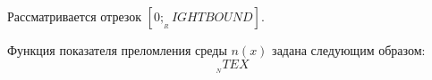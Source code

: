 Рассматривается отрезок $[0; __RIGHTBOUND]$.

Функция показателя преломления среды $n(x)$ задана следующим
образом:
\begin{equation}\label{__LABEL}
__NTEX
\end{equation}